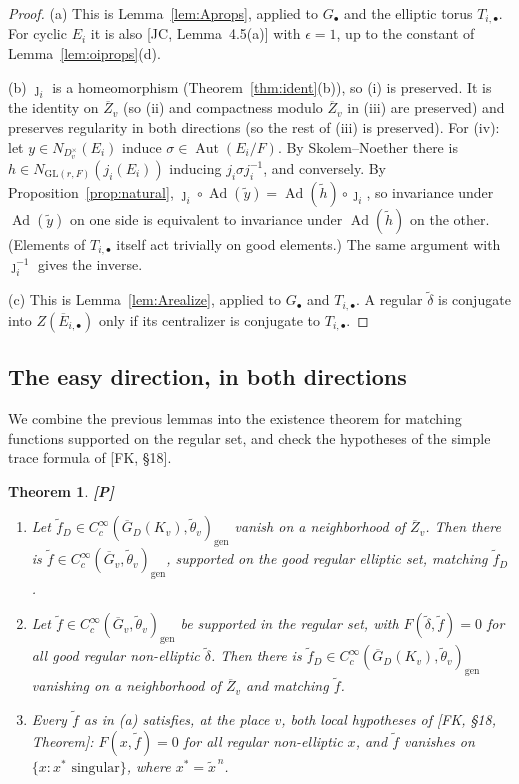 \documentclass[12pt]{article}
\newcommand{\ov}[1]{\overline{#1}}
\newcommand{\eps}{\epsilon}
\newcommand{\gen}{\mathrm{gen}}
\newcommand{\Aut}{\operatorname{Aut}}
\newcommand{\Ad}{\operatorname{Ad}}
\newcommand{\GL}{\mathrm{GL}}
\newcommand{\Gb}{\ov{G}}
\newcommand{\Zb}{\ov{Z}}
\newcommand{\GDb}{\ov{G}_D}
\newcommand{\Eb}{\ov{E}}
\newcommand{\jj}{\jmath}
\newcommand{\Pv}{\textbf{[P]}}
\theoremstyle{plain}
\newtheorem{theorem}{Theorem}[section]
\theoremstyle{definition}
\begin{document}
\begin{proof}
(a) This is Lemma~\ref{lem:Aprops}, applied to $G_\bullet$ and the elliptic torus $T_{i,\bullet}$. For cyclic $E_i$ it is also [JC, Lemma~4.5(a)] with $\eps=1$, up to the constant of Lemma~\ref{lem:oiprops}(d).

(b) $\jj_i$ is a homeomorphism (Theorem~\ref{thm:ident}(b)), so (i) is preserved. It is the identity on $\Zb_v$ (so (ii) and compactness modulo $\Zb_v$ in (iii) are preserved) and preserves regularity in both directions (so the rest of (iii) is preserved). For (iv): let $y\in N_{D_v^\times}(E_i)$ induce $\sigma\in\Aut(E_i/F)$. By Skolem--Noether there is $h\in N_{\GL(r,F)}(j_i(E_i))$ inducing $j_i\sigma j_i^{-1}$, and conversely. By Proposition~\ref{prop:natural}, $\jj_i\circ\Ad(\tilde y)=\Ad(\tilde h)\circ\jj_i$, so invariance under $\Ad(\tilde y)$ on one side is equivalent to invariance under $\Ad(\tilde h)$ on the other. (Elements of $T_{i,\bullet}$ itself act trivially on good elements.) The same argument with $\jj_i^{-1}$ gives the inverse.

(c) This is Lemma~\ref{lem:Arealize}, applied to $G_\bullet$ and $T_{i,\bullet}$. A regular $\tilde\delta$ is conjugate into $Z(\Eb_{i,\bullet})$ only if its centralizer is conjugate to $T_{i,\bullet}$.
\end{proof}

\subsection{The easy direction, in both directions}\label{subsec:easy}
We combine the previous lemmas into the existence theorem for matching functions supported on the regular set, and check the hypotheses of the simple trace formula of [FK, \S18].

\begin{theorem}\label{thm:easy}\Pv
\begin{enumerate}[label=(\alph*)]
\item Let $\tilde f_D\in C_c^\infty(\GDb(K_v),\tilde\theta_v)_\gen$ vanish on a neighborhood of $\Zb_v$. Then there is $\tilde f\in C_c^\infty(\Gb_v,\tilde\theta_v)_\gen$, supported on the good regular elliptic set, matching $\tilde f_D$.
\item Let $\tilde f\in C_c^\infty(\Gb_v,\tilde\theta_v)_\gen$ be supported in the regular set, with $F(\tilde\delta,\tilde f)=0$ for all good regular non-elliptic $\tilde\delta$. Then there is $\tilde f_D\in C_c^\infty(\GDb(K_v),\tilde\theta_v)_\gen$ vanishing on a neighborhood of $\Zb_v$ and matching $\tilde f$.
\item Every $\tilde f$ as in (a) satisfies, at the place $v$, both local hypotheses of [FK, \S18, Theorem]: $F(x,\tilde f)=0$ for all regular non-elliptic $x$, and $\tilde f$ vanishes on $\{x:x^*\text{ singular}\}$, where $x^*=\tilde x^{\,n}$.
\end{enumerate}
\end{theorem}
\end{document}
